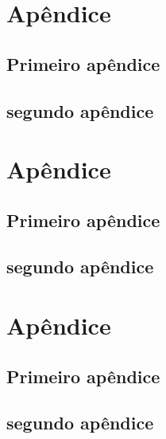 \newpage

 \appendix
 \newpage
 \section{Apêndice}
 \subsection{Primeiro apêndice}
 \subsection{segundo apêndice}
 \section{Apêndice}
 \subsection{Primeiro apêndice}
 \subsection{segundo apêndice}
 \section{Apêndice}
 \subsection{Primeiro apêndice}
 \subsection{segundo apêndice}
\newpage
